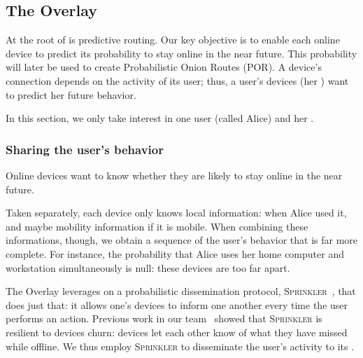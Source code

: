 \subsection{The \squad Overlay} 
\label{sec:squad_overlay}

At the root of \name is predictive routing.
Our key objective is to enable each online device to predict its probability to stay online in the near future.
This probability will later be used to create Probabilistic Onion Routes (POR).
A device's connection depends on the activity of its user; thus, a user's devices (her \squad) want to predict her future behavior.

In this section, we only take interest in one user (called Alice) and her \squad.



\subsubsection{Sharing the user's behavior} %
\label{sub:sharing_knowledge}

Online devices want to know whether they are likely to stay online in the near future.

Taken separately, each device only knows local information: when Alice used it, and maybe mobility information if it is mobile.
When combining these informations, though, we obtain a sequence of the user's behavior that is far more complete.
For instance, the probability that Alice uses her home computer and workstation simultaneously is null: these devices are too far apart.

The \squad Overlay leverages on a probabilistic dissemination protocol, \textsc{Sprinkler}~\cite{luxey:hal-01704172}, that does just that: 
it allows one's devices to inform one another every time the user performs an action.
Previous work in our team~\cite{luxey:cascade} showed that \textsc{Sprinkler} is resilient to devices churn: 
devices let each other know of what they have missed while offline.
We thus employ \textsc{Sprinkler} to disseminate the user's activity to its \squad.

